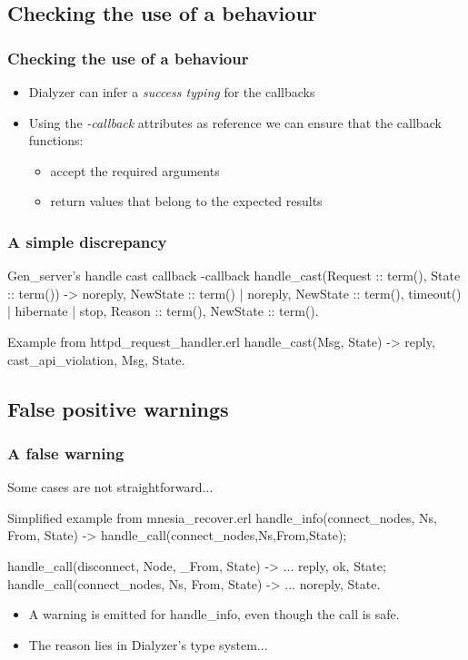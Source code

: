 \documentclass{beamer}
\begin{document}
\subsection{Checking the use of a behaviour}

\begin{frame}
  \frametitle{Checking the use of a behaviour}
  \begin{itemize}
    \item Dialyzer can infer a \emph{success typing} for the callbacks
      \pause
    \item Using the \emph{-callback} attributes as reference we can
      ensure that the callback functions:
      \begin{itemize}
        \item accept the required arguments
        \item return values that belong to the expected results
      \end{itemize}
  \end{itemize}
\end{frame}

\begin{frame}[fragile]
  \frametitle{A simple discrepancy}
\begin{code}{Gen\_server's handle cast callback}
-callback handle_cast(Request :: term(),
                      State :: term()) ->
  {noreply, NewState :: term()} | 
  {noreply, NewState :: term(), timeout() | hibernate} | 
  {stop, Reason :: term(), NewState :: term()}.
\end{code}
\begin{code}{Example from httpd\_request\_handler.erl}
handle_cast(Msg, State) ->
    {reply, {cast_api_violation, Msg}, State}.
\end{code}
\end{frame}

\subsection{False positive warnings}

\begin{frame}[fragile]
  \frametitle{A false warning}
  Some cases are not straightforward...
\begin{code}{Simplified example from mnesia\_recover.erl}
  handle_info({connect_nodes, Ns, From}, State) ->
    handle_call({connect_nodes,Ns},From,State);

  handle_call({disconnect, Node}, _From, State) ->
    ...
    {reply, ok, State};
  handle_call({connect_nodes, Ns}, From, State) ->
    ...
    {noreply, State}.
\end{code}
  \pause
  \begin{itemize}
  \item A warning is emitted for handle\_info, even though the call is
    safe. \pause
  \item The reason lies in Dialyzer's type system...
  \end{itemize}
\end{frame}
\end{document}
